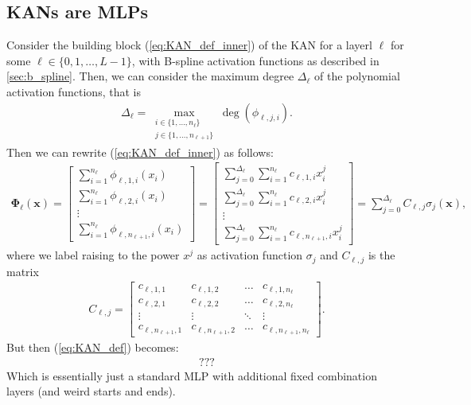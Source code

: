 \documentclass{article}
\begin{document}
\subsection{KANs are MLPs}
Consider the building block (\ref{eq:KAN_def_inner}) of the KAN for a layerl $\ell$ for some $\ell \in \lbrace 0,1, \dots, L-1 \rbrace$, 
with B-spline activation functions as described in \ref{sec:b_spline}. Then, we can consider the maximum degree $\Delta_{\ell}$ of the polynomial activation functions, that is
\begin{align}
    \Delta_{\ell} = \max_{\substack{i \in \lbrace 1, \dots, n_{\ell} \rbrace \\ j \in \lbrace 1, \dots, n_{\ell + 1} \rbrace}}\deg(\phi_{\ell, j, i}).
\end{align}
Then we can rewrite (\ref{eq:KAN_def_inner}) as follows:
\begin{align}
    \mathbf{\Phi}_{\ell}(\mathbf{x}) = \begin{bmatrix}
        \sum_{i=1}^{n_{\ell}} \phi_{\ell, 1, i}(x_{i}) \\
        \sum_{i=1}^{n_{\ell}} \phi_{\ell, 2, i}(x_{i}) \\
        \vdots \\
        \sum_{i=1}^{n_{\ell}} \phi_{\ell, n_{\ell + 1}, i}(x_{i}) 
    \end{bmatrix} = \begin{bmatrix}
        \sum_{j=0}^{\Delta_{\ell}}\sum_{i=1}^{n_{\ell}} c_{\ell, 1, i}x_{i}^{j} \\
        \sum_{j=0}^{\Delta_{\ell}}\sum_{i=1}^{n_{\ell}} c_{\ell, 2, i}x_{i}^{j} \\
        \vdots \\
        \sum_{j=0}^{\Delta_{\ell}}\sum_{i=1}^{n_{\ell}} c_{\ell, n_{\ell + 1}, i}x_{i}^{j} 
    \end{bmatrix} = \sum_{j=0}^{\Delta_{\ell}} C_{\ell, j} \sigma_j(\mathbf{x}),
\end{align}
where we label raising to the power $x^j$ as activation function $\sigma_j$ and $C_{\ell, j}$ is the matrix
\begin{align}
    C_{\ell, j} = \begin{bmatrix}
        c_{\ell, 1, 1} & c_{\ell, 1, 2} & \dots & c_{\ell, 1, n_{\ell}} \\
        c_{\ell, 2, 1} & c_{\ell, 2, 2} & \dots & c_{\ell, 2, n_{\ell}} \\
        \vdots & \vdots & \ddots & \vdots \\
        c_{\ell, n_{\ell+1}, 1} & c_{\ell, n_{\ell+1}, 2} & \dots & c_{\ell, n_{\ell+1}, n_{\ell}}
    \end{bmatrix}.
\end{align}
But then (\ref{eq:KAN_def}) becomes:
\begin{align}
    ???
\end{align}
Which is essentially just a standard MLP with additional fixed combination layers (and weird starts and ends). %
\end{document}
